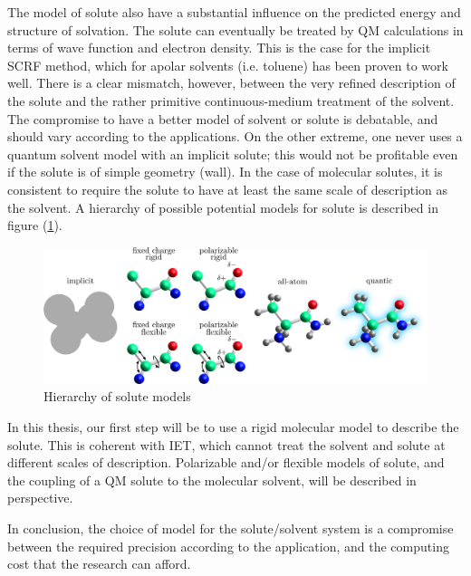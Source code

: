 The model of solute also have a substantial influence on the predicted
energy and structure of solvation. The solute can eventually be treated
by \acs{QM} calculations in terms of wave function and electron density.
This is the case for the implicit SCRF method, which for apolar solvents
(i.e. toluene) has been proven to work well. There is a clear mismatch,
however, between the very refined description of the solute and the
rather primitive continuous-medium treatment of the solvent. The compromise
to have a better model of solvent or solute is debatable, and should
vary according to the applications. On the other extreme, one never
uses a quantum solvent model with an implicit solute; this would not
be profitable even if the solute is of simple geometry (wall). In
the case of molecular solutes, it is consistent to require the solute
to have at least the same scale of description as the solvent. A hierarchy
of possible potential models for solute is described in figure (\ref{fig:Hierarchy-of-models}).
\begin{figure}[h]
\centering{}%
\noindent\begin{minipage}[t]{1\columnwidth}%
\begin{center}
\includegraphics[width=1\columnwidth]{_figure/solute}
\par\end{center}%
\end{minipage}\caption{Hierarchy of solute models\label{fig:Hierarchy-of-models}}
\end{figure}

In this thesis, our first step will be to use a rigid molecular model
to describe the solute. This is coherent with IET, which cannot treat
the solvent and solute at different scales of description. Polarizable
and/or flexible models of solute, and the coupling of a \acs{QM}
solute to the molecular solvent, will be described in perspective.

In conclusion, the choice of model for the solute/solvent system is
a compromise between the required precision according to the application,
and the computing cost that the research can afford.
